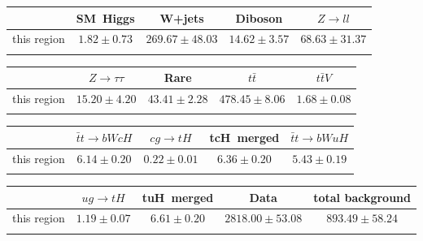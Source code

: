 \centering
\begin{tabular}{ccccc} \toprule\toprule
 & SM~Higgs & W+jets & Diboson & $Z\to ll$\\\midrule
this region & $1.82\pm0.73$ & $269.67\pm48.03$ & $14.62\pm3.57$ & $68.63\pm31.37$\\
\bottomrule\bottomrule\\
\end{tabular}
\begin{tabular}{ccccc} \toprule\toprule
 & $Z\to \tau\tau$ & Rare & $t\bar{t}$ & $t\bar{t}V$\\\midrule
this region & $15.20\pm4.20$ & $43.41\pm2.28$ & $478.45\pm8.06$ & $1.68\pm0.08$\\
\bottomrule\bottomrule\\
\end{tabular}
\begin{tabular}{ccccc} \toprule\toprule
 & $\bar{t}t\to bWcH$ & $cg\to tH$ & tcH~merged & $\bar{t}t\to bWuH$\\\midrule
this region & $6.14\pm0.20$ & $0.22\pm0.01$ & $6.36\pm0.20$ & $5.43\pm0.19$\\
\bottomrule\bottomrule\\
\end{tabular}
\begin{tabular}{ccccc} \toprule\toprule
 & $ug\to tH$ & tuH~merged & Data & total background\\\midrule
this region & $1.19\pm0.07$ & $6.61\pm0.20$ & $2818.00\pm53.08$ & $893.49\pm58.24$\\
\bottomrule\bottomrule\\
\end{tabular}
